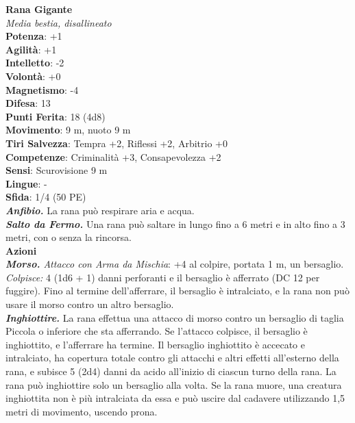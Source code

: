 \begin{multicols}{2}
\medskip\textbf{Rana Gigante}\\
\emph{Media bestia, disallineato}\\
\textbf{Potenza}: +1\\
\textbf{Agilità}: +1\\
\textbf{Intelletto}: -2\\
\textbf{Volontà}: +0\\
\textbf{Magnetismo}: -4\\
\textbf{Difesa}: 13\\
\textbf{Punti Ferita}: 18 (4d8)\\
\textbf{Movimento}: 9 m, nuoto 9 m\\
\textbf{Tiri Salvezza}: Tempra +2, Riflessi +2, Arbitrio +0 \\
\textbf{Competenze}: Criminalità +3, Consapevolezza +2\\
\textbf{Sensi}: Scurovisione 9 m\\
\textbf{Lingue}: -\\
\textbf{Sfida}: 1/4 (50 PE)\smallskip\\
\emph{\textbf{Anfibio.}} La rana può respirare aria e acqua.\\
\emph{\textbf{Salto da Fermo.}} Una rana può saltare in lungo fino a 6 metri e in alto fino a 3 metri, con o senza la rincorsa.\\
\smallskip\textbf{Azioni}\\
\emph{\textbf{Morso.} Attacco con Arma da Mischia}: +4 al colpire, portata 1 m, un bersaglio.\\
\emph{Colpisce:} 4 (1d6 + 1) danni perforanti e il bersaglio è afferrato (DC  12 per fuggire). Fino al termine dell'afferrare, il bersaglio è intralciato, e la rana non può usare il morso contro un altro bersaglio.\\
\emph{\textbf{Inghiottire.}} La rana effettua una attacco di morso contro un bersaglio di taglia Piccola o inferiore che sta afferrando. Se l'attacco colpisce, il bersaglio è inghiottito, e l'afferrare ha termine. Il bersaglio inghiottito è accecato e intralciato, ha copertura totale contro gli attacchi e altri effetti all'esterno della rana, e subisce 5 (2d4) danni da acido all'inizio di ciascun turno della rana. La rana può inghiottire solo un bersaglio alla volta. Se la rana muore, una creatura inghiottita non è più intralciata da essa e può uscire dal cadavere utilizzando 1,5 metri di movimento, uscendo prona.\\


\end{multicols}
